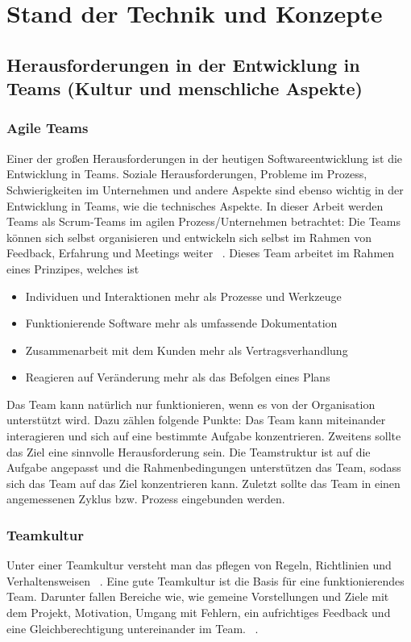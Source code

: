 \chapter{Stand der Technik und Konzepte}
\chapterstart

\label{chap:related}
\section{Herausforderungen in der Entwicklung in Teams (Kultur und menschliche Aspekte)}
\subsection{Agile Teams}
Einer der großen Herausforderungen in der heutigen Softwareentwicklung ist die Entwicklung in Teams. Soziale Herausforderungen, Probleme im Prozess, Schwierigkeiten im Unternehmen und andere Aspekte sind ebenso wichtig in der Entwicklung in Teams, wie die technisches Aspekte. In dieser Arbeit werden Teams als Scrum-Teams im agilen Prozess/Unternehmen betrachtet: Die Teams können sich selbst organisieren und entwickeln sich selbst im Rahmen von Feedback, Erfahrung und Meetings weiter ~\parencite{cohn2003introducing}. Dieses Team arbeitet im Rahmen eines Prinzipes, welches ist ~\parencite{beck2001agile}
\begin{itemize} 
\item Individuen und Interaktionen mehr als Prozesse und Werkzeuge
\item Funktionierende Software mehr als umfassende Dokumentation
\item Zusammenarbeit mit dem Kunden mehr als Vertragsverhandlung
\item Reagieren auf Veränderung mehr als das Befolgen eines Plans
\end{itemize}
Das Team kann natürlich nur funktionieren, wenn es von der Organisation unterstützt wird. Dazu zählen folgende Punkte: Das Team kann miteinander interagieren und sich auf eine bestimmte Aufgabe konzentrieren. Zweitens sollte das Ziel eine sinnvolle Herausforderung sein. Die Teamstruktur ist auf die Aufgabe angepasst und die Rahmenbedingungen unterstützen das Team, sodass sich das Team auf das Ziel konzentrieren kann. Zuletzt sollte das Team in einen angemessenen Zyklus bzw. Prozess eingebunden werden. ~\parencite{boos2017fuhrung}
\subsection{Teamkultur}
Unter einer Teamkultur versteht man das pflegen von Regeln, Richtlinien und Verhaltensweisen ~\parencite{teamculture}. Eine gute Teamkultur ist die Basis für eine funktionierendes Team. Darunter fallen Bereiche wie, wie gemeine Vorstellungen und Ziele mit dem Projekt, Motivation, Umgang mit Fehlern, ein aufrichtiges Feedback und eine Gleichberechtigung untereinander im Team. ~\parencite{teamcultureGrolman}. 
